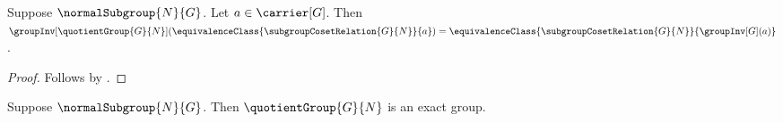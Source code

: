 \begin{proposition}\label{quotient_group_inv_apply}
    Suppose $\normalSubgroup{N}{G}$.
    Let $a\in\carrier[G]$.
    Then
        $\groupInv[\quotientGroup{G}{N}]
            (\equivalenceClass{\subgroupCosetRelation{G}{N}}{a})
        =\equivalenceClass
            {\subgroupCosetRelation{G}{N}}
            {\groupInv[G](a)}$.
\end{proposition}
\begin{proof}
    Follows by
        .
\end{proof}

\begin{theorem}\label{quotient_group_is_exact_group}
    Suppose $\normalSubgroup{N}{G}$.
    Then $\quotientGroup{G}{N}$ is an exact group.
\end{theorem}
